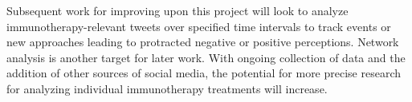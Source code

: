 Subsequent work for improving upon this project will look to analyze
immunotherapy-relevant tweets over specified time intervals to track
events or new approaches leading to protracted negative or positive
perceptions.  Network analysis is another target for later work.  With
ongoing collection of data and the addition of other sources of social
media, the potential for more precise research for analyzing
individual immunotherapy treatments will increase.



 

